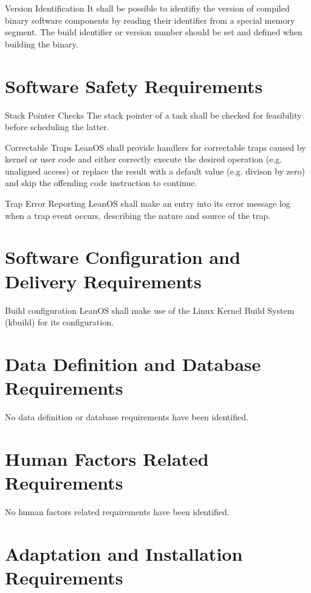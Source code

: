  {Version Identification}{%
It shall be possible to identifiy the version of compiled binary software
components by reading their identifier from a special memory segment.
}{
The build identifier or version number should be set and defined when building
the binary.
}%


\section{Software Safety Requirements}

 {Stack Pointer Checks}{%
The stack pointer of a task shall be checked for feasibility before scheduling
the latter.
}{
}%

 {Correctable Traps}{%
LeanOS shall provide handlers for correctable traps caused by kernel or user
code and either correctly execute the desired operation (e.g. unaligned access)
or replace the result with a default value (e.g. divison by zero) and skip the
offending code instruction to continue.
}{
}

 {Trap Error Reporting}{%
LeanOS shall make an entry into its error message log when a trap event occurs,
describing the nature and source of the trap.
}{
}



\section{Software Configuration and Delivery Requirements}

 {Build configuration}{%
LeanOS shall make use of the Linux Kernel Build System (kbuild) for its
configuration.
}{}%


\section{Data Definition and Database Requirements}

No data definition or database requirements have been identified.


\section{Human Factors Related Requirements}

No human factors related requirements have been identified.

\section{Adaptation and Installation Requirements}

